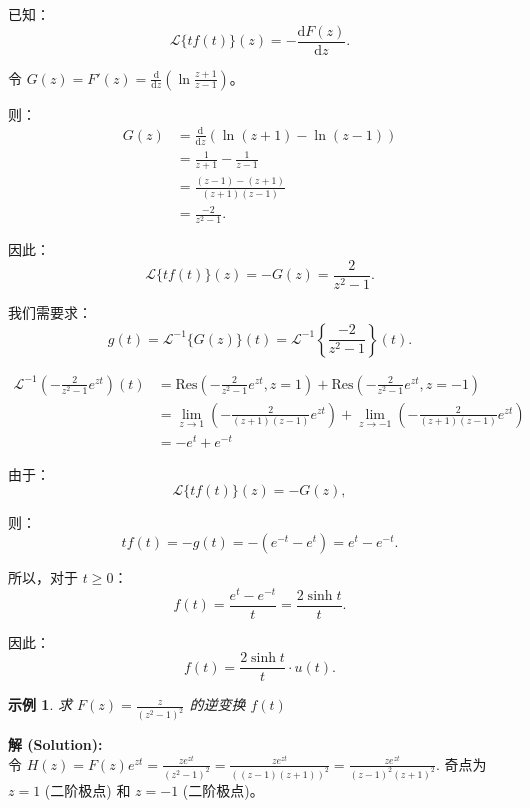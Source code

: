 \documentclass[linespread=1.5,openany]{book}%
\theoremstyle{plain}
\newtheorem{example}[theorem]{示例}
\begin{document}
{{{{{{{									已知：
									\[
									\mathcal{L}\{tf(t)\}(z) = -\frac{\mathrm{d}F(z)}{\mathrm{d}z}.
									\]
									
									令 \( G(z) = F'(z) = \frac{\mathrm{d}}{\mathrm{d}z} \left( \ln\frac{z+1}{z-1} \right) \)。
									
									则：
									\begin{align*}
										G(z) &= \frac{\mathrm{d}}{\mathrm{d}z} \left( \ln(z+1) - \ln(z-1) \right) \\
										&= \frac{1}{z+1} - \frac{1}{z-1} \\
										&= \frac{(z-1) - (z+1)}{(z+1)(z-1)} \\
										&= \frac{-2}{z^2 - 1}.
									\end{align*}
									
									因此：
									\[
									\mathcal{L}\{tf(t)\}(z) = -G(z) = \frac{2}{z^2 - 1}.
									\]
									
									我们需要求：
									\[
									g(t) = \mathcal{L}^{-1}\{G(z)\}(t) = \mathcal{L}^{-1}\left\{\frac{-2}{z^2 - 1}\right\}(t).
									\]
									
									\begin{align*}
										\mathcal{L}^{-1}\left(-\frac{2}{z^2 - 1} e^{zt}\right)(t) &= \text{Res}\left(-\frac{2}{z^2 - 1} e^{zt}, z=1\right) + \text{Res}\left(-\frac{2}{z^2 - 1} e^{zt}, z=-1\right) \\[6pt]
										&= \lim_{z \to 1} \left(-\frac{2}{(z + 1)(z - 1)} e^{zt}\right) + \lim_{z \to -1} \left(-\frac{2}{(z + 1)(z - 1)} e^{zt}\right) \\[6pt]
										&= -e^{t} + e^{-t}
									\end{align*}
									
									由于：
									\[
									\mathcal{L}\{tf(t)\}(z) = -G(z),
									\]
									
									则：
									\[
									tf(t) = -g(t) = -(e^{-t} - e^t) = e^t - e^{-t}.
									\]
									
									所以，对于 \( t \geq 0 \)：
									\[
									f(t) = \frac{e^t - e^{-t}}{t} = \frac{2 \sinh t}{t}.
									\]
									
									因此：
									\[
									f(t) = \frac{2 \sinh t}{t} \cdot u(t).
									\]
									\vspace{\baselineskip}
									
									\begin{example}求 $F(z) = \frac{z}{(z^2-1)^2}$ 的逆变换 $f(t)$ \label{ex:L16_inv_laplace_ex6}
									\end{example}
									\noindent\textbf{解 (Solution):} \\
									令 $H(z) = F(z)e^{zt} = \frac{z e^{zt}}{(z^2-1)^2} = \frac{z e^{zt}}{((z-1)(z+1))^2} = \frac{z e^{zt}}{(z-1)^2(z+1)^2}$.
									奇点为 $z=1$ (二阶极点) 和 $z=-1$ (二阶极点)。
									
}}}}}}}
\end{document}
